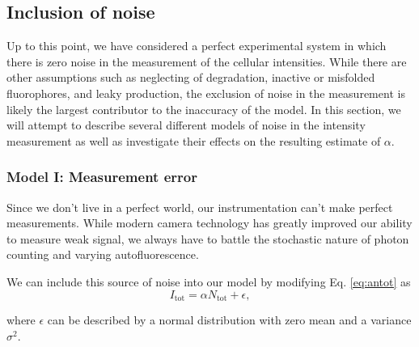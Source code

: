 \begin{figure}[h!]
\end{figure}

\subsection*{Inclusion of noise}
Up to this point, we have considered a perfect experimental system in which
there is zero noise in the measurement of the cellular intensities. While there
are other assumptions such as neglecting of degradation, inactive or misfolded
fluorophores, and leaky production, the exclusion of noise in the measurement
is likely the largest contributor to the inaccuracy of the model. In this section,
we will attempt to describe several different models of noise in the intensity
measurement as well as investigate their effects on the resulting estimate of
$\alpha$.

\subsubsection*{Model I: Measurement error}

Since we don't live in a perfect world, our instrumentation can't make perfect
measurements. While modern camera technology has greatly improved our ability
to measure weak signal, we always have to battle the stochastic nature of photon
counting and varying autofluorescence.

We can include this source of noise into our model by modifying Eq. \ref{eq:antot}
as
\begin{equation}
  I_\text{tot} = \alpha N_\text{tot} + \epsilon,
  \label{eq:model1}
\end{equation}

where $\epsilon$ can be described by a normal distribution with zero mean and
a variance $\sigma^2$.

